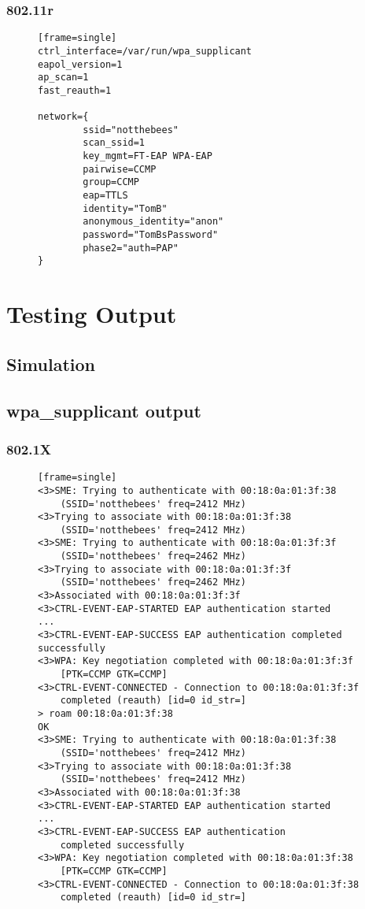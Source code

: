 \subsubsection{802.11r}
\begin{figure}[h!]
\begin{verbatim}[frame=single]
ctrl_interface=/var/run/wpa_supplicant
eapol_version=1
ap_scan=1
fast_reauth=1

network={
        ssid="notthebees"
        scan_ssid=1
        key_mgmt=FT-EAP WPA-EAP
        pairwise=CCMP
        group=CCMP
        eap=TTLS
        identity="TomB"
        anonymous_identity="anon"
        password="TomBsPassword"
        phase2="auth=PAP"
}
\end{verbatim}
\end{figure}

\newpage
\section{Testing Output}

\subsection{Simulation}
\label{sec:testing-output;sub:simulation}

\subsection{wpa\_supplicant output}
\subsubsection{802.1X}
\label{sec:testing-output;sub:supplicant}
\begin{figure}[h!]
\begin{verbatim}[frame=single]
<3>SME: Trying to authenticate with 00:18:0a:01:3f:38
    (SSID='notthebees' freq=2412 MHz)
<3>Trying to associate with 00:18:0a:01:3f:38
    (SSID='notthebees' freq=2412 MHz)
<3>SME: Trying to authenticate with 00:18:0a:01:3f:3f
    (SSID='notthebees' freq=2462 MHz)
<3>Trying to associate with 00:18:0a:01:3f:3f
    (SSID='notthebees' freq=2462 MHz)
<3>Associated with 00:18:0a:01:3f:3f
<3>CTRL-EVENT-EAP-STARTED EAP authentication started
...
<3>CTRL-EVENT-EAP-SUCCESS EAP authentication completed successfully
<3>WPA: Key negotiation completed with 00:18:0a:01:3f:3f
    [PTK=CCMP GTK=CCMP]
<3>CTRL-EVENT-CONNECTED - Connection to 00:18:0a:01:3f:3f
    completed (reauth) [id=0 id_str=]
> roam 00:18:0a:01:3f:38
OK
<3>SME: Trying to authenticate with 00:18:0a:01:3f:38
    (SSID='notthebees' freq=2412 MHz)
<3>Trying to associate with 00:18:0a:01:3f:38
    (SSID='notthebees' freq=2412 MHz)
<3>Associated with 00:18:0a:01:3f:38
<3>CTRL-EVENT-EAP-STARTED EAP authentication started
...
<3>CTRL-EVENT-EAP-SUCCESS EAP authentication
    completed successfully
<3>WPA: Key negotiation completed with 00:18:0a:01:3f:38
    [PTK=CCMP GTK=CCMP]
<3>CTRL-EVENT-CONNECTED - Connection to 00:18:0a:01:3f:38
    completed (reauth) [id=0 id_str=]
\end{verbatim}
\end{figure}

